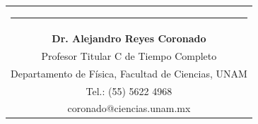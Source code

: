 \documentclass[11pt,letterpaper]{article}
\begin{document}
	{\vspace{-2.85cm}\hspace{7cm}\begin{tabular} { c}
			\setlength{\tabcolsep}{15pt}
			\renewcommand{\arraystretch}{1}
			\noindent\rule{5.5cm}{0.4pt}\qquad \\
			
			\qquad  \textbf{Dr. Alejandro Reyes Coronado} \qquad \\
			\qquad Profesor Titular C de Tiempo Completo  \qquad \\  
			\qquad Departamento de Física, Facultad de Ciencias, UNAM\qquad \\ 
			\qquad  Tel.: (55) 5622 4968 \qquad \\
			\qquad coronado@ciencias.unam.mx \qquad \\
			
		\end{tabular}
		
	}
	
	
	
	
	
	
	
	
	
	
	
	
	
	
	
	
	
	
	
	
	
	
	
	
	
	
	
	\printbibliography
	
\end{document}
